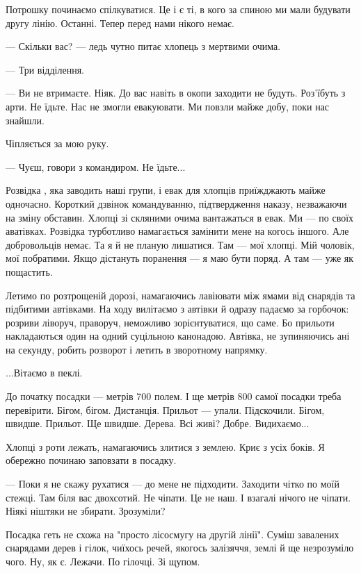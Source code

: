 Потрошку починаємо спілкуватися. Це і є ті, в кого за спиною ми мали будувати
другу лінію. Останні. Тепер перед нами нікого немає. 

— Скільки вас? — ледь чутно питає  хлопець  з мертвими очима.

— Три відділення.

— Ви не втримаєте. Ніяк. До вас навіть в окопи заходити  не будуть. Роз'їбуть з
арти. Не їдьте. Нас не змогли евакуювати. Ми повзли майже добу, поки нас
знайшли. 

Чіпляється за мою руку. 

— Чуєш,  говори з командиром. Не їдьте...

Розвідка , яка заводить наші групи, і евак для хлопців приїжджають майже
одночасно. Короткий дзвінок командуванню, підтвердження наказу, незважаючи на
зміну обставин.  Хлопці зі скляними  очима вантажаться в евак. Ми — по своїх
аватівках. Розвідка  турботливо  намагається замінити мене на когось іншого.
Але добровольців  немає. Та я й не планую лишатися. Там — мої хлопці.  Мій
чоловік, мої побратими. Якщо дістануть поранення — я маю бути поряд. А там —
уже  як пощастить. 

Летимо  по розтрощеній  дорозі, намагаючись  лавіювати між ямами від снарядів
та підбитими  автівками. На ходу вилітаємо з автівки й одразу падаємо за
горбочок: розриви ліворуч, праворуч, неможливо зорієнтуватися, що саме. Бо
прильоти накладаються один на одний суцільною канонадою. Автівка, не
зупиняючись ані на секунду, робить розворот і  летить в зворотному напрямку.  


...Вітаємо в пеклі. 

До початку посадки — метрів 700 полем. І ще метрів 800 самої посадки треба
перевірити. Бігом, бігом. Дистанція.  Прильот — упали. Підскочили. Бігом,
швидше. Прильот. Ще швидше. Дерева. Всі  живі? Добре. Видихаємо...

Хлопці з роти лежать, намагаючись злитися з землею.  Криє з усіх боків.  Я
обережно починаю заповзати в посадку. 

— Поки  я не скажу рухатися — до мене не підходити. Заходити чітко по моїй
стежці. Там біля вас двохсотий. Не чіпати. Це не наш. І взагалі нічого не
чіпати. Ніякі ніштяки не збирати. Зрозуміли? 

Посадка геть не схожа на "просто лісосмугу на другій лінії". Суміш завалених
снарядами дерев і гілок, чиїхось речей, якогось залізяччя, землі й ще
незрозуміло чого. Ну, як є.  Лежачи. По гілочці. Зі щупом. 

